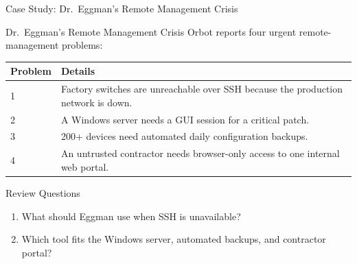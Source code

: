 \documentclass[aspectratio=169]{beamer}  %
\begin{document}
\begin{frame}[t]{Case Study: Dr.\ Eggman's Remote Management Crisis}
    \begin{casestudy}{Dr.\ Eggman's Remote Management Crisis}
        \footnotesize
        Orbot reports four urgent remote-management problems:

        \vspace{0.3em}
        \begin{center}
            \begin{tabular}{l p{8.0cm}}
                \toprule
                \textbf{Problem} & \textbf{Details} \\
                \midrule
                1 & Factory switches are unreachable over SSH because the production network is down. \\
                2 & A Windows server needs a GUI session for a critical patch. \\
                3 & 200+ devices need automated daily configuration backups. \\
                4 & An untrusted contractor needs browser-only access to one internal web portal. \\
                \bottomrule
            \end{tabular}
        \end{center}
    \end{casestudy}
    \begin{block}{Review Questions}
        \begin{enumerate}
            \footnotesize
            \item What should Eggman use when SSH is unavailable?
            \item Which tool fits the Windows server, automated backups, and contractor portal?
        \end{enumerate}
    \end{block}
\end{frame}
\end{document}
